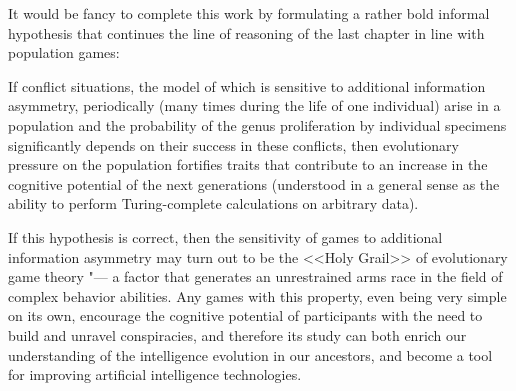 It would be fancy to complete this work by formulating a rather bold informal hypothesis that continues the line of reasoning of the last chapter in line with population games: %
\begin{conjecture}
	If conflict situations, the model of which is sensitive to additional information asymmetry, periodically (many times during the life of one individual) arise in a population and the probability of the genus proliferation by individual specimens significantly depends on their success in these conflicts, then evolutionary pressure on the population fortifies traits that contribute to an increase in the cognitive potential of the next generations (understood in a general sense as the ability to perform Turing-complete calculations on arbitrary data). %
\end{conjecture}

If this hypothesis is correct, then the sensitivity of games to additional information asymmetry may turn out to be the <<Holy Grail>> of evolutionary game theory "--- a factor that generates an unrestrained arms race in the field of complex behavior abilities. Any games with this property, even being very simple on its own, encourage the cognitive potential of participants with the need to build and unravel conspiracies, and therefore its study can both enrich our understanding of the intelligence evolution in our ancestors, and become a tool for improving artificial intelligence technologies. %

\clearpage